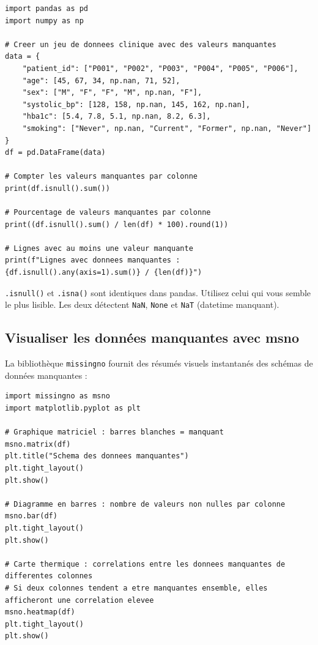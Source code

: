 \begin{verbatim}
import pandas as pd
import numpy as np

# Creer un jeu de donnees clinique avec des valeurs manquantes
data = {
    "patient_id": ["P001", "P002", "P003", "P004", "P005", "P006"],
    "age": [45, 67, 34, np.nan, 71, 52],
    "sex": ["M", "F", "F", "M", np.nan, "F"],
    "systolic_bp": [128, 158, np.nan, 145, 162, np.nan],
    "hba1c": [5.4, 7.8, 5.1, np.nan, 8.2, 6.3],
    "smoking": ["Never", np.nan, "Current", "Former", np.nan, "Never"]
}
df = pd.DataFrame(data)

# Compter les valeurs manquantes par colonne
print(df.isnull().sum())

# Pourcentage de valeurs manquantes par colonne
print((df.isnull().sum() / len(df) * 100).round(1))

# Lignes avec au moins une valeur manquante
print(f"Lignes avec donnees manquantes : {df.isnull().any(axis=1).sum()} / {len(df)}")
\end{verbatim}

\begin{pythontip}
\texttt{.isnull()} et \texttt{.isna()} sont identiques dans pandas. Utilisez celui qui vous semble le plus lisible. Les deux d\'etectent \texttt{NaN}, \texttt{None} et \texttt{NaT} (datetime manquant).
\end{pythontip}

\subsection{Visualiser les donn\'ees manquantes avec msno}

La biblioth\`eque \texttt{missingno} fournit des r\'esum\'es visuels instantan\'es des sch\'emas de donn\'ees manquantes :

\begin{verbatim}
import missingno as msno
import matplotlib.pyplot as plt

# Graphique matriciel : barres blanches = manquant
msno.matrix(df)
plt.title("Schema des donnees manquantes")
plt.tight_layout()
plt.show()

# Diagramme en barres : nombre de valeurs non nulles par colonne
msno.bar(df)
plt.tight_layout()
plt.show()

# Carte thermique : correlations entre les donnees manquantes de differentes colonnes
# Si deux colonnes tendent a etre manquantes ensemble, elles afficheront une correlation elevee
msno.heatmap(df)
plt.tight_layout()
plt.show()
\end{verbatim}

